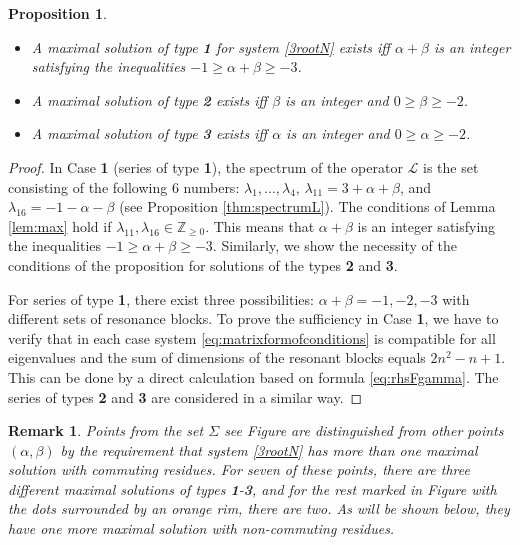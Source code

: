 \documentclass{article}
\theoremstyle{plain}
\newtheorem{proposition}{Proposition}
\newtheorem{remark}{Remark}
\begin{document}
\begin{proposition} \label{thm:albetcond_maxsol}
\phantom{}
\vspace{-0.2cm}
\begin{itemize}
    \item[\rm{i)}]
    A maximal solution of type {\bf 1} for system \eqref{3rootN} exists iff $\alpha+\beta$ is an integer satisfying the inequalities $-1 \geq \alpha+\beta\geq -3$.
    
    \vspace{-0.2cm}
    \item[\rm{ii)}]
    A maximal solution of type {\bf 2} exists iff $\beta$ is an integer and $0 \geq \beta\geq -2$. 
    
    \vspace{-0.2cm}
    \item[\rm{iii)}]
    A maximal solution of type {\bf 3} exists iff $\alpha$ is an integer and $0 \geq \alpha \geq -2$.
\end{itemize}
\end{proposition}
\begin{proof}
In Case {\bf1} (series of type {\bf 1}), the spectrum of the operator $\mathcal L$ is the set consisting of the following 6 numbers: $\lambda_1,\dots, \lambda_4,\, \lambda_{11} = 3 + \alpha + \beta$, and $\lambda_{16}= - 1 - \alpha - \beta$ (see Proposition \ref{thm:spectrumL}). The conditions of Lemma \ref{lem:max} hold if $\lambda_{11},\lambda_{16} \in \mathbb{Z}_{\geq 0}$. This means that $\alpha+\beta$ is an integer satisfying the inequalities $-1 \geq \alpha+\beta\geq -3$. Similarly, we show the necessity of the conditions of the proposition for solutions of the types {\bf 2} and {\bf 3}.

For series of type {\bf 1}, there exist three possibilities: $\alpha+\beta=-1,-2, -3$ with different sets of resonance blocks. To prove the sufficiency in Case {\bf 1}, we have to verify that in each case system \eqref{eq:matrixformofconditions} is compatible for all eigenvalues and the sum of dimensions of the resonant blocks equals $2 n^2 - n + 1$. This can be done by a direct calculation based on formula \eqref{eq:rhsFgamma}. The series of types {\bf 2} and {\bf 3} are considered in a similar way.
\end{proof}

\begin{remark}
Points from the set $\Sigma$ \text{\rm(}see Figure \text{\rm \ref{pic:albetplane}}\text{\rm)} are distinguished from other points $(\alpha,\beta)$ by the requirement that system \eqref{3rootN} has more than one maximal solution with commuting residues. For seven of these points, there are three different maximal solutions of types  {\bf1}-{\bf3}, and for the rest \text{\rm(}marked in Figure \text{\rm \ref{pic:albetplane}} with the dots surrounded by an orange rim\text{\rm)}, there are two. As will be shown below, they have one more maximal solution with non-commuting residues.
\end{remark}
\end{document}
